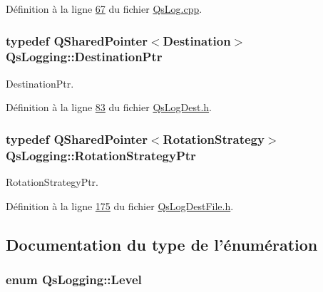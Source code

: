 Définition à la ligne \hyperlink{QsLog_8cpp_source_l00067}{67} du fichier \hyperlink{QsLog_8cpp_source}{Qs\-Log.\-cpp}.

\hypertarget{namespaceQsLogging_a8fe41cf859d617f1c23515f804d1e8ec}{
\subsubsection[{Destination\-Ptr}]{\setlength{\rightskip}{0pt plus 5cm}typedef Q\-Shared\-Pointer$<${\bf Destination}$>$ {\bf Qs\-Logging\-::\-Destination\-Ptr}}}\label{namespaceQsLogging_a8fe41cf859d617f1c23515f804d1e8ec}


Destination\-Ptr. 



Définition à la ligne \hyperlink{QsLogDest_8h_source_l00083}{83} du fichier \hyperlink{QsLogDest_8h_source}{Qs\-Log\-Dest.\-h}.

\hypertarget{namespaceQsLogging_a41dc81d39cd3d36d9e15746bd9174be0}{
\subsubsection[{Rotation\-Strategy\-Ptr}]{\setlength{\rightskip}{0pt plus 5cm}typedef Q\-Shared\-Pointer$<${\bf Rotation\-Strategy}$>$ {\bf Qs\-Logging\-::\-Rotation\-Strategy\-Ptr}}}\label{namespaceQsLogging_a41dc81d39cd3d36d9e15746bd9174be0}


Rotation\-Strategy\-Ptr. 



Définition à la ligne \hyperlink{QsLogDestFile_8h_source_l00175}{175} du fichier \hyperlink{QsLogDestFile_8h_source}{Qs\-Log\-Dest\-File.\-h}.



\subsection{Documentation du type de l'énumération}
\hypertarget{namespaceQsLogging_a38c7dd87e4de6f8eb460763ad0baa033}{
\subsubsection[{Level}]{\setlength{\rightskip}{0pt plus 5cm}enum {\bf Qs\-Logging\-::\-Level}}}\label{namespaceQsLogging_a38c7dd87e4de6f8eb460763ad0baa033}


